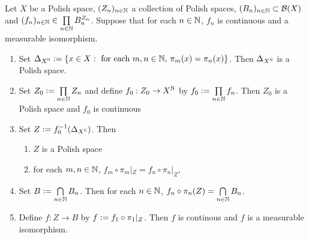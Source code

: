 \documentclass{book}
\begin{document}
	\begin{ex} 
		Let $X$ be a Polish space, $(Z_n)_{n \in \mathbb{N}}$ a collection of Polish spaces, $(B_n)_{n \in \mathbb{N}} \subset \mathcal{B}(X)$ and $(f_n)_{n \in \mathbb{N}} \in \prod\limits_{n \in \mathbb{N}} B_n^{Z_n}$. Suppose that for each $n \in \mathbb{N}$, $f_n$ is continuous and a measurable isomorphism. 
		\begin{enumerate}
			\item Set $\Delta_{X^{\mathbb{N}}} \vcentcolon= \{x \in X: \text{ for each $m,n \in \mathbb{N}$, $\pi_m(x) = \pi_n(x)$}\}$. Then $\Delta_{X^{\mathbb{N}}}$ is a Polish space.  
			\item Set $Z_0 \vcentcolon= \prod\limits_{n \in \mathbb{N}} Z_n$ and define $f_0: Z_0 \rightarrow X^{\mathbb{N}}$ by $f_0 \vcentcolon= \prod\limits_{n \in \mathbb{N}} f_n$. Then $Z_0$ is a Polish space and $f_0$ is continuous
			\item Set $Z \vcentcolon= f_0^{-1}(\Delta_{X^{\mathbb{N}}})$. Then 
			\begin{enumerate}
				\item $Z$ is a Polish space
				\item for each $m,n \in \mathbb{N}$, $f_m \circ \pi_m|_Z = f_n \circ \pi_n|_Z$,
			\end{enumerate}
			\item Set $B \vcentcolon= \bigcap\limits_{n \in \mathbb{N}} B_n$. Then for each $n \in \mathbb{N}$, $f_n \circ \pi_n(Z) = \bigcap\limits_{n \in \mathbb{N}} B_n$.
			\item Define $f:Z \rightarrow B$ by $f \vcentcolon= f_1 \circ \pi_1|_Z$. Then $f$ is continous and $f$ is a measurable isomorphism.
		\end{enumerate}
	\end{ex}
\end{document}

